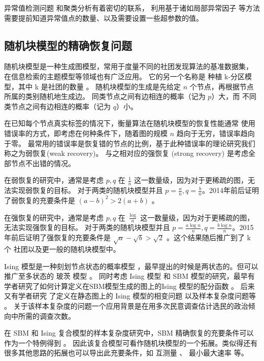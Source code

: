 异常值检测问题 \cite{grubbs1969procedures} 和聚类分析有着密切的联系，
利用基于诸如局部异常因子 \cite{Breunig} 等方法需要提前知道异常值点的数量、以及需要设置一些超参数的值。
\subsection{随机块模型的精确恢复问题}
随机块模型是一种生成图模型，常用于度量不同的社团发现算法的基准数据集，
在信息检索的主题模型等领域也有广泛应用\cite{Gerlach_2018}。
它的另一个名称是 种植 k-分区模型，其中 k 是社团的数量 。
随机块模型的生成是先给定 $n$ 个节点，再根据节点所属的类别随机地生成边。
同类节点之间有边相连的概率（记为 $p$）大，而
不同类节点之间有边相连的概率（记为 $q$）小。\cite{abbe2017community}

在已知每个节点真实标签的情况下，衡量算法在随机块模型的恢复性能通常
使用错误率的方式，即考虑在何种条件下，随着图的规模 $n$ 趋向于无穷，错误率趋向于零。
最常用的错误率是恢复错的节点的比例，基于此种错误率的理论研究我们称之为弱恢复(weak recovery)。
与之相对应的强恢复 (strong recovery) 是考虑全部节点不出错的情况。

在弱恢复的研究中，通常是考虑 $p, q$ 在 $\frac{1}{n}$ 这一数量级，因为对于更稀疏的图，无法实现弱恢复的目标。
对于两类的随机块模型并且 $p=\frac{a}{n}, q = \frac{b}{n}$。2014年前后证明了弱恢复的充要条件是 $(a-b)^2 > 2(a+b)$
\cite{mossel2015reconstruction, mossel2018proof}。

在强恢复的研究中，通常是考虑 $p, q$ 在 $\frac{\log}{n}$ 这一数量级，因为对于更稀疏的图，无法实现强恢复的目标。
对于两类的随机块模型并且 $p=\frac{a \log n}{n}, q = \frac{b \log n }{n}$。2015年前后证明了强恢复的充要条件是
$\sqrt{a} - \sqrt{b} > \sqrt{2}$ \cite{abbe2015exact, mossel2016}。这个结果随后推广到了 k 个
社团以及更一般的随机块模型中\cite{abbe2015community}。

Ising 模型是一种刻划节点状态的概率模型 \cite{ising1925beitrag}，最早提出的时候是两状态的。但可以推广至多状态的 玻茨 模型 \cite{potts1952some}。
同时考虑 Ising 模型 和 SBM 模型的研究，最早有学者研究了如何计算定义在SBM模型生成的图上的Ising 模型的配分函数 \cite{liu2017log}。
后来又有学者研究 了定义在静态图上的 Ising 模型的相变问题 \cite{berthet2019exact} 以及样本复杂度问题等 \cite{ye2020exact}。
关于该样本复杂度的问题一个应用背景是在用多次民意调查估计选民的政治倾向中所需的调查次数。

在 SBM 和 Ising 复合模型的样本复杂度研究中，SBM 精确恢复的充要条件可以作为一个特例得到 \cite{ye2020exact}。
因此该复合模型可看作随机块模型的一个拓展。类似得还有很多其他思路的拓展也可以导出此充要条件，如 互测量 \cite{chen2016information}、 最小最大速率 \cite{zhang2016} 等。

